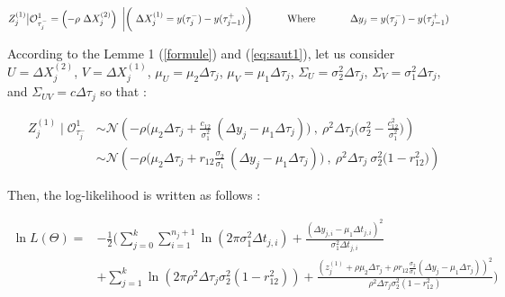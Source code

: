  

\begin{align}
Z_j^{(1)} \big | \mathcal{O}^1_{\tau_j^-}&= \left(-\rho \ \Delta X^{(2)}_j \right)\ \bigg | \bigg( \ \Delta X^{(1)}_j=y(\tau_j^-)- y(\tau_{j-1}^+) \bigg) \text{ \hspace{1 cm} Where \hspace{1 cm} } \Delta y_j= y(\tau_j^-)- y(\tau_{j-1}^+)
\end{align}


\noindent According to the Lemme 1 (\ref{formule}) and (\ref{eq:saut1}), let us consider $U=\Delta X^{(2)}_j$, $V=\Delta X^{(1)}_j$, $\mu_U=\mu_2 \Delta \tau_j$, $\mu_V=\mu_1 \Delta \tau_j$, $\Sigma_U=\sigma_2^2 \Delta \tau_j$, $\Sigma_V=\sigma_1^2 \Delta \tau_j$, and $\Sigma_{UV}=c \Delta \tau_j$  so that :

\begin{align}
Z_j^{(1)} \mid \mathcal{O}^1_{\tau_j^-}&\sim \mathcal{N}\left( - \rho\big( \mu_2 \Delta \tau_j + \frac{c_{12}}{\sigma_1^2} \ (\Delta y_{j}-\mu_1 \Delta \tau_j)\big)\ , \  \rho^2 \Delta \tau_j\big(\sigma_2^2 -\frac{ c_{12}^2 }{\sigma_1^2}\big)\right)\nonumber \\
&\sim \mathcal{N}\left( - \rho\big( \mu_2 \Delta \tau_j + r_{12}\frac{ \sigma_2}{\sigma_1} \ (\Delta y_{j}-\mu_1 \Delta \tau_j)\big)\ , \  \rho^2 \Delta \tau_j\ \sigma_2^2\big( 1-r_{12}^2\big)\right)
\end{align}

\noindent Then, the log-likelihood is written as follows :

\begin{align}
\ln L(\Theta)=&-\frac{1}{2} \Bigg(\sum \limits_{j=0}^k \sum_{i=1}^{n_j+1} \ln(2\pi\sigma_1^2\Delta t_{j,i})+ \frac{(\Delta y_{j,i}-\mu_1 \Delta t_{j,i})^2}{\sigma_1^2 \Delta t_{j,i}} \nonumber \\
&+ \sum_{j=1}^{k} \ln(2\pi \rho^2\Delta \tau_j \sigma_2^2(1-r_{12}^2))+\frac{(z_j^{(1)}+\rho \mu_2 \Delta \tau_j+\rho r_{12}\frac{\sigma_2}{\sigma_1}(\Delta y_{j}-\mu_1 \Delta \tau_j))^2}{\rho^2 \Delta \tau_j \sigma_2^2 (1-r_{12}^2)}\Bigg)
\label{eq:likelihood}
\end{align}

